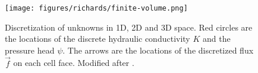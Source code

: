 \begin{figure}[!htbp]
\begin{center}
\texttt{[image: figures/richards/finite-volume.png]}
\end{center}
\caption{Discretization of unknowns in 1D, 2D and 3D space. Red circles are the locations of the discrete hydraulic conductivity $K$ and the pressure head $\psi$.
The arrows are the locations of the discretized flux $\vec f$ on each cell face. Modified after \cite{fvtutorial}.}
\label{fig:richards-finite-volume}
\end{figure}
